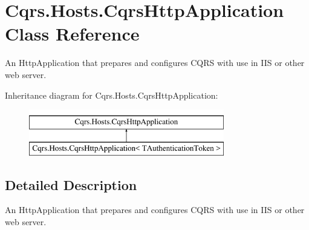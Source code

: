 \hypertarget{classCqrs_1_1Hosts_1_1CqrsHttpApplication}{}\section{Cqrs.\+Hosts.\+Cqrs\+Http\+Application Class Reference}
\label{classCqrs_1_1Hosts_1_1CqrsHttpApplication}


An Http\+Application that prepares and configures C\+Q\+RS with use in I\+IS or other web server.  


Inheritance diagram for Cqrs.\+Hosts.\+Cqrs\+Http\+Application\+:\begin{figure}[H]
\begin{center}
\leavevmode
\includegraphics[height=2.000000cm]{classCqrs_1_1Hosts_1_1CqrsHttpApplication}
\end{center}
\end{figure}


\subsection{Detailed Description}
An Http\+Application that prepares and configures C\+Q\+RS with use in I\+IS or other web server. 

